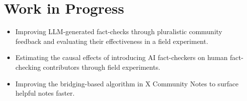 \documentclass[a4paper,11pt]{article}
\begin{document}
\section{\textbf{Work in Progress}}
\vspace{1mm}
\begin{itemize}[leftmargin=*,labelsep=1mm,itemsep=0.5mm,parsep=0mm]
\item Improving LLM-generated fact-checks through pluralistic community feedback and evaluating their effectiveness in a field experiment.
\item Estimating the causal effects of introducing AI fact-checkers on human fact-checking contributors through field experiments.
\item Improving the bridging-based algorithm in X Community Notes to surface helpful notes faster.
\end{itemize}
\vspace{-1mm}
\end{document}
